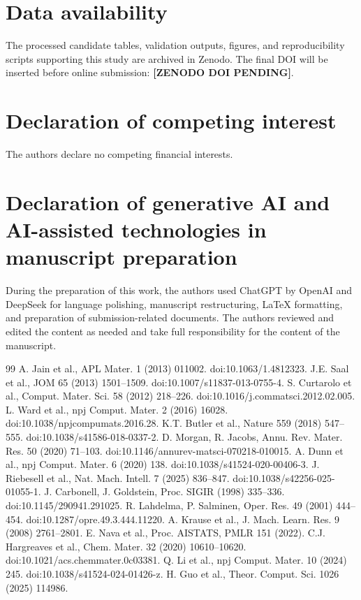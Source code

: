 \documentclass[final,5p,times,twocolumn]{elsarticle}
\begin{document}
\section*{Data availability}
The processed candidate tables, validation outputs, figures, and reproducibility scripts supporting this study are archived in Zenodo. The final DOI will be inserted before online submission: \textbf{[ZENODO DOI PENDING]}.

\section*{Declaration of competing interest}
The authors declare no competing financial interests.

\section*{Declaration of generative AI and AI-assisted technologies in manuscript preparation}
During the preparation of this work, the authors used ChatGPT by OpenAI and DeepSeek for language polishing, manuscript restructuring, LaTeX formatting, and preparation of submission-related documents. The authors reviewed and edited the content as needed and take full responsibility for the content of the manuscript.

\begin{thebibliography}{99}
 A. Jain et al., APL Mater. 1 (2013) 011002. doi:10.1063/1.4812323.
 J.E. Saal et al., JOM 65 (2013) 1501--1509. doi:10.1007/s11837-013-0755-4.
 S. Curtarolo et al., Comput. Mater. Sci. 58 (2012) 218--226. doi:10.1016/j.commatsci.2012.02.005.
 L. Ward et al., npj Comput. Mater. 2 (2016) 16028. doi:10.1038/npjcompumats.2016.28.
 K.T. Butler et al., Nature 559 (2018) 547--555. doi:10.1038/s41586-018-0337-2.
 D. Morgan, R. Jacobs, Annu. Rev. Mater. Res. 50 (2020) 71--103. doi:10.1146/annurev-matsci-070218-010015.
 A. Dunn et al., npj Comput. Mater. 6 (2020) 138. doi:10.1038/s41524-020-00406-3.
 J. Riebesell et al., Nat. Mach. Intell. 7 (2025) 836--847. doi:10.1038/s42256-025-01055-1.
 J. Carbonell, J. Goldstein, Proc. SIGIR (1998) 335--336. doi:10.1145/290941.291025.
 R. Lahdelma, P. Salminen, Oper. Res. 49 (2001) 444--454. doi:10.1287/opre.49.3.444.11220.
 A. Krause et al., J. Mach. Learn. Res. 9 (2008) 2761--2801.
 E. Nava et al., Proc. AISTATS, PMLR 151 (2022).
 C.J. Hargreaves et al., Chem. Mater. 32 (2020) 10610--10620. doi:10.1021/acs.chemmater.0c03381.
 Q. Li et al., npj Comput. Mater. 10 (2024) 245. doi:10.1038/s41524-024-01426-z.
 H. Guo et al., Theor. Comput. Sci. 1026 (2025) 114986.
\end{thebibliography}
\end{document}
